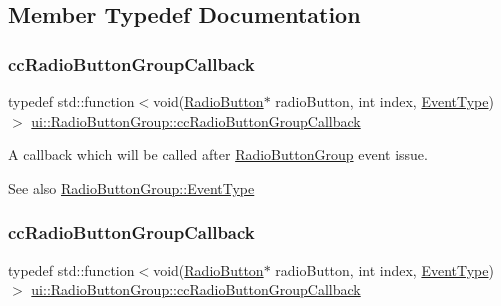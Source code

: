 \subsection{Member Typedef Documentation}
\mbox{\label{classui_1_1RadioButtonGroup_a8385f08613e843c5977252ed03c37e22}} 
\subsubsection{\texorpdfstring{cc\+Radio\+Button\+Group\+Callback}{ccRadioButtonGroupCallback}\hspace{0.1cm}{\footnotesize\ttfamily [1/2]}}
{\footnotesize\ttfamily typedef std\+::function$<$void(\hyperlink{classui_1_1RadioButton}{Radio\+Button}$\ast$ radio\+Button, int index, \hyperlink{classui_1_1RadioButtonGroup_a41d61680b8001bd43abfccbf49eecef3}{Event\+Type})$>$ \hyperlink{classui_1_1RadioButtonGroup_a8385f08613e843c5977252ed03c37e22}{ui\+::\+Radio\+Button\+Group\+::cc\+Radio\+Button\+Group\+Callback}}

A callback which will be called after \hyperlink{classui_1_1RadioButtonGroup}{Radio\+Button\+Group} event issue. \begin{DoxySeeAlso}{See also}
{\ttfamily \hyperlink{classui_1_1RadioButtonGroup_a41d61680b8001bd43abfccbf49eecef3}{Radio\+Button\+Group\+::\+Event\+Type}} 
\end{DoxySeeAlso}
\mbox{\label{classui_1_1RadioButtonGroup_a8385f08613e843c5977252ed03c37e22}} 
\subsubsection{\texorpdfstring{cc\+Radio\+Button\+Group\+Callback}{ccRadioButtonGroupCallback}\hspace{0.1cm}{\footnotesize\ttfamily [2/2]}}
{\footnotesize\ttfamily typedef std\+::function$<$void(\hyperlink{classui_1_1RadioButton}{Radio\+Button}$\ast$ radio\+Button, int index, \hyperlink{classui_1_1RadioButtonGroup_a41d61680b8001bd43abfccbf49eecef3}{Event\+Type})$>$ \hyperlink{classui_1_1RadioButtonGroup_a8385f08613e843c5977252ed03c37e22}{ui\+::\+Radio\+Button\+Group\+::cc\+Radio\+Button\+Group\+Callback}}

